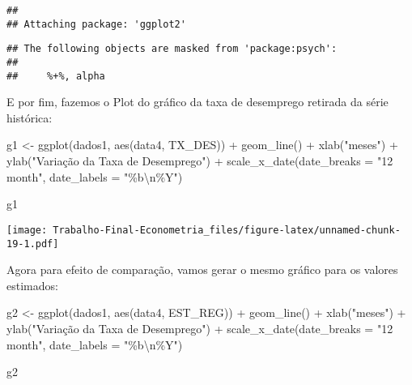 \documentclass[
]{article}
\newenvironment{Shaded}{\begin{snugshade}}{\end{snugshade}}
\newcommand{\AttributeTok}[1]{\textcolor[rgb]{0.77,0.63,0.00}{#1}}
\newcommand{\FunctionTok}[1]{\textcolor[rgb]{0.00,0.00,0.00}{#1}}
\newcommand{\NormalTok}[1]{#1}
\newcommand{\OtherTok}[1]{\textcolor[rgb]{0.56,0.35,0.01}{#1}}
\newcommand{\SpecialCharTok}[1]{\textcolor[rgb]{0.00,0.00,0.00}{#1}}
\newcommand{\StringTok}[1]{\textcolor[rgb]{0.31,0.60,0.02}{#1}}
\begin{document}
\begin{verbatim}
## 
## Attaching package: 'ggplot2'
\end{verbatim}

\begin{verbatim}
## The following objects are masked from 'package:psych':
## 
##     %+%, alpha
\end{verbatim}

E por fim, fazemos o Plot do gráfico da taxa de desemprego retirada da
série histórica:

\begin{Shaded}
\begin{Highlighting}[]
\NormalTok{g1 }\OtherTok{\textless{}{-}} \FunctionTok{ggplot}\NormalTok{(dados1, }\FunctionTok{aes}\NormalTok{(data4, TX\_DES)) }\SpecialCharTok{+} 
  \FunctionTok{geom\_line}\NormalTok{() }\SpecialCharTok{+}
  \FunctionTok{xlab}\NormalTok{(}\StringTok{"meses"}\NormalTok{) }\SpecialCharTok{+} 
  \FunctionTok{ylab}\NormalTok{(}\StringTok{"Variação da Taxa de Desemprego"}\NormalTok{) }\SpecialCharTok{+} 
  \FunctionTok{scale\_x\_date}\NormalTok{(}\AttributeTok{date\_breaks =} \StringTok{"12 month"}\NormalTok{, }\AttributeTok{date\_labels =} \StringTok{"\%b}\SpecialCharTok{\textbackslash{}n}\StringTok{\%Y"}\NormalTok{)}

\NormalTok{g1}
\end{Highlighting}
\end{Shaded}

\texttt{[image: Trabalho-Final-Econometria\_files/figure-latex/unnamed-chunk-19-1.pdf]}

Agora para efeito de comparação, vamos gerar o mesmo gráfico para os
valores estimados:

\begin{Shaded}
\begin{Highlighting}[]
\NormalTok{g2 }\OtherTok{\textless{}{-}} \FunctionTok{ggplot}\NormalTok{(dados1, }\FunctionTok{aes}\NormalTok{(data4, EST\_REG)) }\SpecialCharTok{+} 
  \FunctionTok{geom\_line}\NormalTok{() }\SpecialCharTok{+}
  \FunctionTok{xlab}\NormalTok{(}\StringTok{"meses"}\NormalTok{) }\SpecialCharTok{+} 
  \FunctionTok{ylab}\NormalTok{(}\StringTok{"Variação da Taxa de Desemprego"}\NormalTok{) }\SpecialCharTok{+} 
  \FunctionTok{scale\_x\_date}\NormalTok{(}\AttributeTok{date\_breaks =} \StringTok{"12 month"}\NormalTok{, }\AttributeTok{date\_labels =} \StringTok{"\%b}\SpecialCharTok{\textbackslash{}n}\StringTok{\%Y"}\NormalTok{)}

\NormalTok{g2}
\end{Highlighting}
\end{Shaded}
\end{document}

